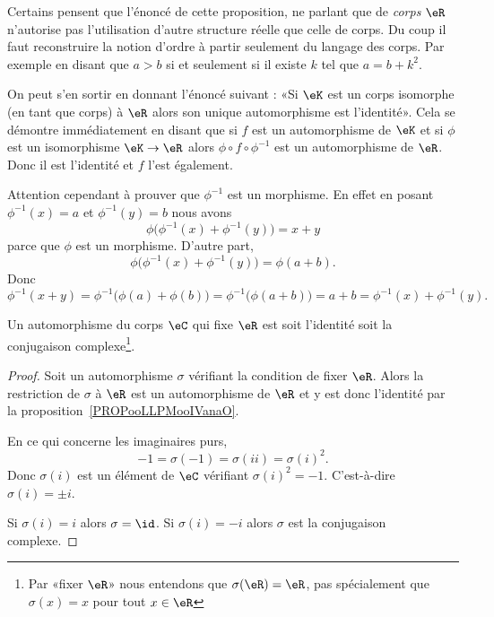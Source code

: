 \begin{remark}      \label{REMooGHEDooOYYUPk}
	Certains\cite{ooEKUSooDDDWuT} pensent que l'énoncé de cette proposition, ne parlant que de \emph{corps} \( \eR\) n'autorise pas l'utilisation d'autre structure réelle que celle de corps. Du coup il faut reconstruire la notion d'ordre à partir seulement du langage des corps. Par exemple en disant que \( a>b\) si et seulement si il existe \( k\) tel que \( a=b+k^2\).

	On peut s'en sortir en donnant l'énoncé suivant : «Si \( \eK\) est un corps isomorphe (en tant que corps) à \( \eR\) alors son unique automorphisme est l'identité». Cela se démontre immédiatement en disant que si \( f\) est un automorphisme de \( \eK\) et si \( \phi\) est un isomorphisme \( \eK\to \eR\) alors \( \phi\circ f\circ \phi^{-1}\) est un automorphisme de \( \eR\). Donc il est l'identité et \( f\) l'est également.

	Attention cependant à prouver que \( \phi^{-1}\) est un morphisme. En effet en posant \( \phi^{-1}(x)=a\) et \( \phi^{-1}(y)=b\) nous avons
	\begin{equation}
		\phi\big( \phi^{-1}(x)+\phi^{-1}(y) \big)=x+y
	\end{equation}
	parce que \( \phi\) est un morphisme. D'autre part,
	\begin{equation}
		\phi\big( \phi^{-1}(x)+\phi^{-1}(y) \big)=\phi(a+b).
	\end{equation}
	Donc
	\begin{equation}
		\phi^{-1}(x+y)=\phi^{-1}\big( \phi(a)+\phi(b) \big)=\phi^{-1}\big( \phi(a+b) \big)=a+b=\phi^{-1}(x)+\phi^{-1}(y).
	\end{equation}
\end{remark}

\begin{proposition}     \label{PROPooEATMooIPPrRV}
	Un automorphisme du corps \( \eC\) qui fixe \( \eR\) est soit l'identité soit la conjugaison complexe\footnote{Par «fixer \( \eR\)» nous entendons que \( \sigma(\eR)=\eR\), pas spécialement que \( \sigma(x)=x\) pour tout \( x\in \eR\)}.
\end{proposition}

\begin{proof}
	Soit un automorphisme \( \sigma\) vérifiant la condition de fixer \( \eR\). Alors la restriction de \( \sigma\) à \( \eR\) est un automorphisme de \( \eR\) et y est donc l'identité par la proposition~\ref{PROPooLLPMooIVanaO}.

	En ce qui concerne les imaginaires purs,
	\begin{equation}
		-1=\sigma(-1)=\sigma(ii)=\sigma(i)^2.
	\end{equation}
	Donc \( \sigma(i)\) est un élément de \( \eC\) vérifiant \( \sigma(i)^2=-1\). C'est-à-dire \( \sigma(i)=\pm i\).

	Si \( \sigma(i)=i\) alors \( \sigma=\id\). Si \( \sigma(i)=-i\) alors \( \sigma\) est la conjugaison complexe.
\end{proof}

